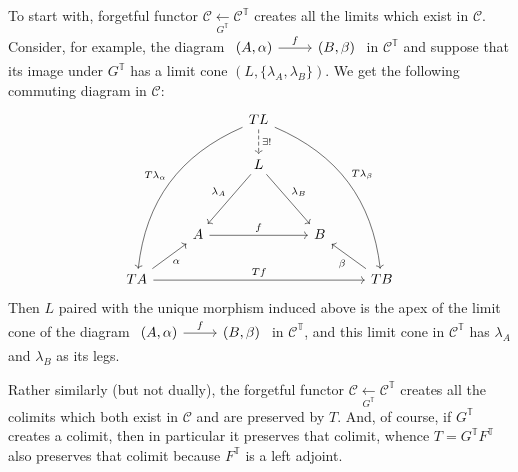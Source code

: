 \documentclass[a4paper,11pt]{article}
\theoremstyle{break_italics}
\theoremstyle{break_upright}
\theoremstyle{remark}
\newcommand{\C}{\mathcal{C}}
\begin{document}
To start with, forgetful functor $\C \xleftarrow[G^{\mathbb T}]{} \C^{\mathbb T}$ creates all the limits which exist in $\C$. Consider, for example, the diagram $\begin{tikzcd}
{(A, \alpha)} \arrow[r, "f"] & {(B,\beta)}
\end{tikzcd}$ in $\C^{\mathbb T}$ and suppose that its image under $G^{\mathbb T}$ has a limit cone $(L, \{\lambda_A, \lambda_B\})$. We get the following commuting diagram in $\C$:
\[
\begin{tikzcd}
                                            &                   & TL \arrow[d, "\exists!", dashed] \arrow[rrdddd, "T\lambda_\beta", bend left] \arrow[lldddd, "T\lambda_\alpha"', bend right] &   &                        \\
                                            &                   & L \arrow[ldd, "\lambda_A"'] \arrow[rdd, "\lambda_B"]                                                        &   &                        \\
                                            &                   &                                                                                                             &   &                        \\
                                            & A \arrow[rr, "f"] &                                                                                                             & B &                        \\
TA \arrow[ru, "\alpha"'] \arrow[rrrr, "Tf"] &                   &                                                                                                             &   & TB \arrow[lu, "\beta"]
\end{tikzcd}
\]
Then $L$ paired with the unique morphism induced above is the apex of the limit cone of the diagram $\begin{tikzcd}
{(A, \alpha)} \arrow[r, "f"] & {(B,\beta)}
\end{tikzcd}$ in $\C^{\mathbb T}$, and this limit cone in $\C^{\mathbb T}$ has $\lambda_A$ and $\lambda_B$ as its legs.

Rather similarly (but not dually), the forgetful functor $\C \xleftarrow[G^{\mathbb T}]{} \C^{\mathbb T}$ creates all the colimits which both exist in $\C$ and are preserved by $T$. And, of course, if $G^\mathbb T$ creates a colimit, then in particular it preserves that colimit, whence $T = G^\mathbb T F^\mathbb T$ also preserves that colimit because $F^\mathbb T$ is a left adjoint.
\end{document}
